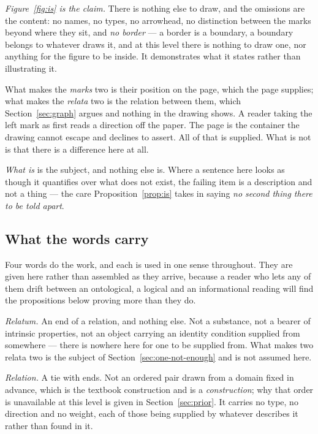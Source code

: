 \documentclass[11pt,a4paper]{article}
\theoremstyle{remark}\newtheorem{remark}[proposition]{Remark}
\begin{document}
\emph{Figure~\ref{fig:is} is the claim.} There is nothing else to draw, and the omissions are the content: no names, no types, no arrowhead, no distinction between the marks beyond where they sit, and \emph{no border} --- a border is a boundary, a boundary belongs to whatever draws it, and at this level there is nothing to draw one, nor anything for the figure to be inside. It demonstrates what it states rather than illustrating it.

What makes the \emph{marks} two is their position on the page, which the page supplies; what makes the \emph{relata} two is the relation between them, which Section~\ref{sec:graph} argues and nothing in the drawing shows. A reader taking the left mark as first reads a direction off the paper. The page is the container the drawing cannot escape and declines to assert. All of that is supplied. What is not is that there is a difference here at all.

\emph{What is} is the subject, and nothing else is. Where a sentence here looks as though it quantifies
over what does not exist, the failing item is a description and not a thing --- the care Proposition~\ref{prop:is}
takes in saying \emph{no second thing there to be told apart}.

\subsection*{What the words carry}
Four words do the work, and each is used in one sense throughout. They are given here rather than
assembled as they arrive, because a reader who lets any of them drift between an ontological, a
logical and an informational reading will find the propositions below proving more than they do.

\emph{Relatum.} An end of a relation, and nothing else. Not a substance, not a bearer of intrinsic
properties, not an object carrying an identity condition supplied from somewhere --- there is nowhere
here for one to be supplied from. What makes two relata two is the subject of
Section~\ref{sec:one-not-enough} and is not assumed here.

\emph{Relation.} A tie with ends. Not an ordered pair drawn from a domain fixed in advance, which is
the textbook construction and is a \emph{construction}; why that order is unavailable at this level is
given in Section~\ref{sec:prior}. It carries no type, no direction and no weight, each of those being
supplied by whatever describes it rather than found in it.
\end{document}
